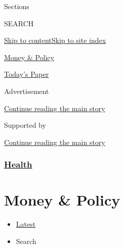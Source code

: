 Sections

SEARCH

\protect\hyperlink{site-content}{Skip to
content}\protect\hyperlink{site-index}{Skip to site index}

\href{https://www.nytimes3xbfgragh.onion/section/health/policy}{Money \&
Policy}

\href{https://myaccount.nytimes3xbfgragh.onion/auth/login?response_type=cookie\&client_id=vi}{}

\href{https://www.nytimes3xbfgragh.onion/section/todayspaper}{Today's
Paper}

Advertisement

\protect\hyperlink{after-top}{Continue reading the main story}

Supported by

\protect\hyperlink{after-sponsor}{Continue reading the main story}

\hypertarget{health}{%
\subsubsection{\texorpdfstring{\href{/section/health}{Health}}{Health}}\label{health}}

\hypertarget{money--policy}{%
\section{Money \& Policy}\label{money--policy}}

\begin{itemize}
\tightlist
\item
  \protect\hyperlink{stream-panel}{Latest}
\item
  Search
\end{itemize}


